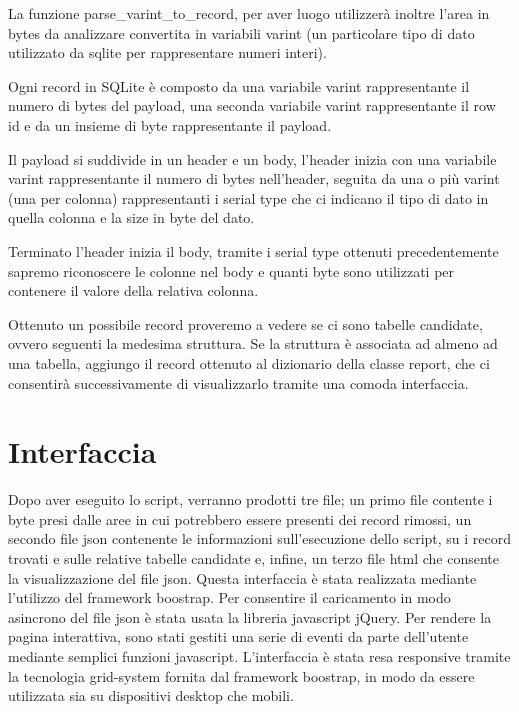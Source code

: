 La funzione parse\string_varint\string_to\string_record, per aver luogo utilizzerà inoltre l’area in bytes da analizzare convertita in variabili varint (un particolare tipo di dato utilizzato da sqlite per rappresentare numeri interi).

\medskip

Ogni record in SQLite è composto da una variabile varint rappresentante il numero di bytes del payload, una seconda variabile varint rappresentante il row id e da un insieme di byte rappresentante il payload.

Il payload si suddivide in un header e un body, l’header inizia con una variabile varint rappresentante il numero di bytes nell’header, seguita da una o più varint (una per colonna) rappresentanti i serial type che ci indicano il tipo di dato in quella colonna e la size in byte del dato.

\medskip

Terminato l’header inizia il body, tramite i serial type ottenuti precedentemente sapremo riconoscere le colonne nel body e quanti byte sono utilizzati per contenere il valore della relativa colonna.

\medskip

Ottenuto un possibile record proveremo a vedere se ci sono tabelle candidate, ovvero seguenti la medesima struttura. Se la struttura è associata ad almeno ad una tabella, aggiungo il record ottenuto al dizionario della classe report, che ci consentirà successivamente di visualizzarlo tramite una comoda interfaccia. 

\section{Interfaccia}
Dopo aver eseguito lo script, verranno prodotti tre file; un primo file contente i byte presi dalle aree in cui potrebbero essere presenti dei record rimossi, un secondo file json contenente le informazioni sull'esecuzione dello script, su i record trovati e sulle relative tabelle candidate e, infine, un terzo file html che consente la visualizzazione del file json.
Questa interfaccia è stata realizzata mediante l'utilizzo del framework boostrap. Per consentire il caricamento in modo asincrono del file json è stata usata la libreria javascript jQuery. \cite{jquery} Per rendere la pagina interattiva, sono stati gestiti una serie di eventi da parte dell'utente mediante semplici funzioni javascript.
L'interfaccia è stata resa responsive tramite la tecnologia grid-system \cite{boostrapgridsystem} fornita dal framework boostrap, in modo da essere utilizzata sia su dispositivi desktop che mobili.

